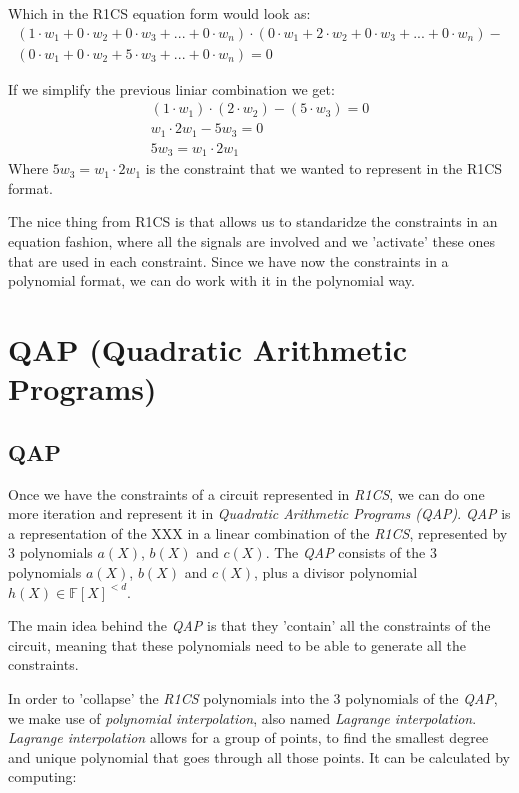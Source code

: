 \documentclass{article}
\begin{document}
Which in the R1CS equation form would look as:
$$
\begin{aligned}
(1 \cdot w_1 + 0 \cdot w_2 + 0 \cdot w_3 + ... + 0 \cdot w_n) \cdot
(0 \cdot w_1 + 2 \cdot w_2 + 0 \cdot w_3 + ... + 0 \cdot w_n) -\\
(0 \cdot w_1 + 0 \cdot w_2 + 5 \cdot w_3 + ... + 0 \cdot w_n) = 0
\end{aligned}
$$

If we simplify the previous liniar combination we get:
$$
\begin{aligned}
(1 \cdot w_1) \cdot (2 \cdot w_2) - (5 \cdot w_3) = 0
\\
w_1 \cdot 2w_1 - 5 w_3 = 0
\\
5 w_3 = w_1 \cdot 2w_1
\end{aligned}
$$
Where $5 w_3 = w_1 \cdot 2w_1$ is the constraint that we wanted to represent in the R1CS format.

The nice thing from R1CS is that allows us to standaridze the constraints in an equation fashion, where all the signals are involved and we 'activate' these ones that are used in each constraint.
Since we have now the constraints in a polynomial format, we can do work with it in the polynomial way.


\section{QAP (Quadratic Arithmetic Programs)} \label{qap}
\subsection{QAP}

Once we have the constraints of a circuit represented in \emph{R1CS}, we can do one more iteration and represent it in \emph{Quadratic Arithmetic Programs (QAP)}.
\emph{QAP} is a representation of the XXX in a linear combination of the \emph{R1CS}, represented by 3 polynomials $a(X)$, $b(X)$ and $c(X)$.
The \emph{QAP} consists of the 3 polynomials $a(X)$, $b(X)$ and $c(X)$, plus a divisor polynomial $h(X) \in \mathbb{F}[X]^{<d}$.

The main idea behind the \emph{QAP} is that they 'contain' all the constraints of the circuit, meaning that these polynomials need to be able to generate all the constraints.

In order to 'collapse' the \emph{R1CS} polynomials into the 3 polynomials of the \emph{QAP}, we make use of \emph{polynomial interpolation}, also named \emph{Lagrange interpolation}. \emph{Lagrange interpolation} allows for a group of points, to find the smallest degree and unique polynomial that goes through all those points. It can be calculated by computing:
\end{document}
